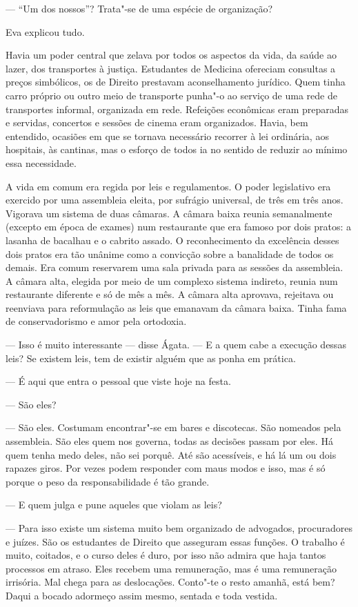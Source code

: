 --- ``Um dos nossos''? Trata"-se de uma espécie de organização?

Eva explicou tudo.

Havia um poder central que zelava por todos os aspectos da vida, da
saúde ao lazer, dos transportes à justiça. Estudantes de Medicina
ofereciam consultas a preços simbólicos, os de Direito prestavam
aconselhamento jurídico. Quem tinha carro próprio ou outro meio de
transporte punha"-o ao serviço de uma rede de transportes informal,
organizada em rede. Refeições econômicas eram preparadas e servidas,
concertos e sessões de cinema eram organizados. Havia, bem entendido,
ocasiões em que se tornava necessário recorrer à lei ordinária, aos
hospitais, às cantinas, mas o esforço de todos ia no sentido de reduzir
ao mínimo essa necessidade.

A vida em comum era regida por leis e regulamentos. O poder legislativo
era exercido por uma assembleia eleita, por sufrágio universal, de três
em três anos. Vigorava um sistema de duas câmaras. A câmara baixa reunia
semanalmente (excepto em época de exames) num restaurante que era
famoso por dois pratos: a lasanha de bacalhau e o cabrito assado. O
reconhecimento da excelência desses dois pratos era tão unânime como a
convicção sobre a banalidade de todos os demais. Era comum reservarem
uma sala privada para as sessões da assembleia. A câmara alta, elegida
por meio de um complexo sistema indireto, reunia num restaurante
diferente e só de mês a mês. A câmara alta aprovava, rejeitava ou
reenviava para reformulação as leis que emanavam da câmara baixa. Tinha fama
de conservadorismo e amor pela ortodoxia.

--- Isso é muito interessante --- disse Ágata. --- E a quem cabe a
  execução dessas leis? Se existem leis, tem de existir alguém que as
  ponha em prática.

--- É aqui que entra o pessoal que viste hoje na festa.

--- São eles?

--- São eles. Costumam encontrar"-se em bares e discotecas. São nomeados
  pela assembleia. São eles quem nos governa, todas as decisões passam
  por eles. Há quem tenha medo deles, não sei porquê. Até são
  acessíveis, e há lá um ou dois rapazes giros. Por vezes podem
  responder com maus modos e isso, mas é só porque o peso da
  responsabilidade é tão grande.

--- E quem julga e pune aqueles que violam as leis?

--- Para isso existe um sistema muito bem organizado de advogados,
  procuradores e juízes. São os estudantes de Direito que asseguram
  essas funções. O trabalho é muito, coitados, e o curso deles é duro,
  por isso não admira que haja tantos processos em atraso. Eles
  recebem uma remuneração, mas é uma remuneração irrisória. Mal chega
  para as deslocações. Conto"-te o resto amanhã, está bem? Daqui a bocado
  adormeço assim mesmo, sentada e toda vestida.

